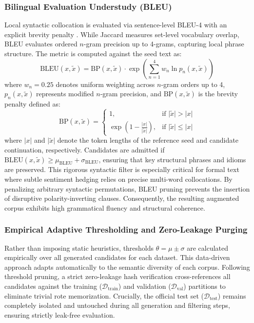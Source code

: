 \documentclass{ieeeaccess}
\begin{document}
\subsubsection{Bilingual Evaluation Understudy (BLEU)}
Local syntactic collocation is evaluated via sentence-level BLEU-4 with an explicit brevity penalty \cite{papineni2002bleu, feng2021survey}. While Jaccard measures set-level vocabulary overlap, BLEU evaluates ordered $n$-gram precision up to 4-grams, capturing local phrase structure. The metric is computed against the seed text as:
\begin{equation}
\label{eq:bleu_metric}
    \text{BLEU}(x, \tilde{x}) = \text{BP}(x, \tilde{x}) \cdot \exp\left(\sum_{n=1}^4 w_n \ln p_n(x, \tilde{x})\right)
\end{equation}
where $w_n = 0.25$ denotes uniform weighting across $n$-gram orders up to 4, $p_n(x, \tilde{x})$ represents modified $n$-gram precision, and $\text{BP}(x, \tilde{x})$ is the brevity penalty defined as:
\begin{equation}
\label{eq:brevity_penalty}
    \text{BP}(x, \tilde{x}) = \begin{cases}
        1, & \text{if } \lvert \tilde{x} \rvert > \lvert x \rvert \\
        \exp\left(1 - \frac{\lvert x \rvert}{\lvert \tilde{x} \rvert}\right), & \text{if } \lvert \tilde{x} \rvert \le \lvert x \rvert
    \end{cases}
\end{equation}
where $\lvert x \rvert$ and $\lvert \tilde{x} \rvert$ denote the token lengths of the reference seed and candidate continuation, respectively. Candidates are admitted if $\text{BLEU}(x, \tilde{x}) \ge \mu_{\text{BLEU}} + \sigma_{\text{BLEU}}$, ensuring that key structural phrases and idioms are preserved. This rigorous syntactic filter is especially critical for formal text where subtle sentiment hedging relies on precise multi-word collocations. By penalizing arbitrary syntactic permutations, BLEU pruning prevents the insertion of disruptive polarity-inverting clauses. Consequently, the resulting augmented corpus exhibits high grammatical fluency and structural coherence.

\subsubsection{Empirical Adaptive Thresholding and Zero-Leakage Purging}
Rather than imposing static heuristics, thresholds $\theta = \mu \pm \sigma$ are calculated empirically over all generated candidates for each dataset. This data-driven approach adapts automatically to the semantic diversity of each corpus. Following threshold pruning, a strict zero-leakage hash verification cross-references all candidates against the training ($\mathcal{D}_{\text{train}}$) and validation ($\mathcal{D}_{\text{val}}$) partitions to eliminate trivial rote memorization. Crucially, the official test set ($\mathcal{D}_{\text{test}}$) remains completely isolated and untouched during all generation and filtering steps, ensuring strictly leak-free evaluation.
\end{document}
